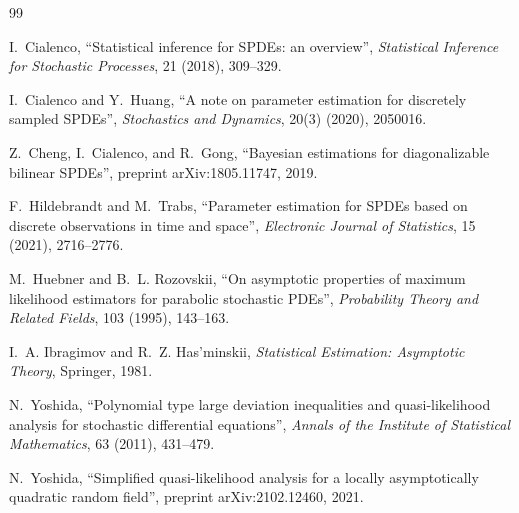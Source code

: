 \documentclass[11pt]{article}
\theoremstyle{remark}
\newcommand{\1}{\mathbf 1}
\begin{document}
\begin{thebibliography}{99}

I.~Cialenco,
``Statistical inference for SPDEs: an overview'',
\emph{Statistical Inference for Stochastic Processes}, 21 (2018), 309--329.

I.~Cialenco and Y.~Huang,
``A note on parameter estimation for discretely sampled SPDEs'',
\emph{Stochastics and Dynamics}, 20(3) (2020), 2050016.

Z.~Cheng, I.~Cialenco, and R.~Gong,
``Bayesian estimations for diagonalizable bilinear SPDEs'',
preprint arXiv:1805.11747, 2019.

F.~Hildebrandt and M.~Trabs,
``Parameter estimation for SPDEs based on discrete observations in time and space'',
\emph{Electronic Journal of Statistics}, 15 (2021), 2716--2776.

M.~Huebner and B.~L. Rozovskii,
``On asymptotic properties of maximum likelihood estimators for parabolic stochastic PDEs'',
\emph{Probability Theory and Related Fields}, 103 (1995), 143--163.

I.~A. Ibragimov and R.~Z. Has'minskii,
\emph{Statistical Estimation: Asymptotic Theory},
Springer, 1981.

N.~Yoshida,
``Polynomial type large deviation inequalities and quasi-likelihood analysis for stochastic differential equations'',
\emph{Annals of the Institute of Statistical Mathematics}, 63 (2011), 431--479.

N.~Yoshida,
``Simplified quasi-likelihood analysis for a locally asymptotically quadratic random field'',
preprint arXiv:2102.12460, 2021.

\end{thebibliography}
\end{document}

